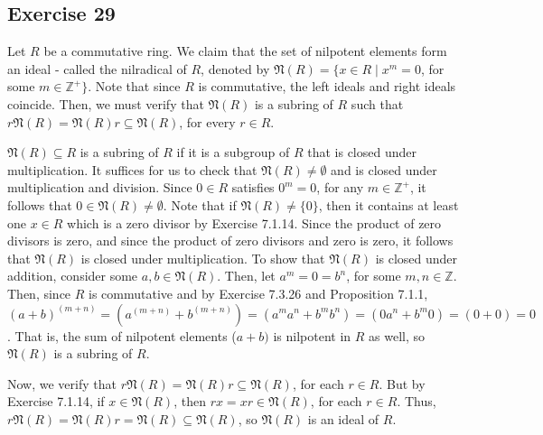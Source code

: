 \subsection*{Exercise 29}
Let $R$ be a commutative ring. We claim that the set of nilpotent elements form an ideal - called the nilradical of $R$, denoted by $\mathfrak{N}(R) = \{x \in R \mid x^m = 0$, for some $m \in \mathbb{Z}^+\}$. Note that since $R$ is commutative, the left ideals and right ideals coincide. Then, we must verify that $\mathfrak{N}(R)$ is a subring of $R$ such that $r\mathfrak{N}(R) = \mathfrak{N}(R)r \subseteq \mathfrak{N}(R)$, for every $r \in R$.

$\mathfrak{N}(R) \subseteq R$ is a subring of $R$ if it is a subgroup of $R$ that is closed under multiplication. It suffices for us to check that $\mathfrak{N}(R) \not= \emptyset$ and is closed under multiplication and division. Since $0 \in R$ satisfies $0^m = 0$, for any $m \in \mathbb{Z}^+$, it follows that $0 \in \mathfrak{N}(R) \not= \emptyset$. Note that if $\mathfrak{N}(R) \not= \{0\}$, then it contains at least one $x \in R$ which is a zero divisor by Exercise 7.1.14. Since the product of zero divisors is zero, and since the product of zero divisors and zero is zero, it follows that $\mathfrak{N}(R)$ is closed under multiplication. To show that $\mathfrak{N}(R)$ is closed under addition, consider some $a,b \in \mathfrak{N}(R)$. Then, let $a^m = 0 = b^n$, for some $m,n \in \mathbb{Z}$. Then, since $R$ is commutative and by Exercise 7.3.26 and Proposition 7.1.1, $(a + b)^{(m+n)} = (a^{(m+n)} + b^{(m+n)}) = (a^ma^n + b^mb^n) = (0a^n + b^m0) = (0 + 0) = 0$. That is, the sum of nilpotent elements ($a + b)$ is nilpotent in $R$ as well, so $\mathfrak{N}(R)$ is a subring of $R$.

Now, we verify that $r\mathfrak{N}(R) = \mathfrak{N}(R)r \subseteq \mathfrak{N}(R)$, for each $r \in R$. But by Exercise 7.1.14, if $x \in \mathfrak{N}(R)$, then $rx = xr \in \mathfrak{N}(R)$, for each $r \in R$. Thus, $r\mathfrak{N}(R) = \mathfrak{N}(R)r = \mathfrak{N}(R) \subseteq \mathfrak{N}(R)$, so $\mathfrak{N}(R)$ is an ideal of $R$.
